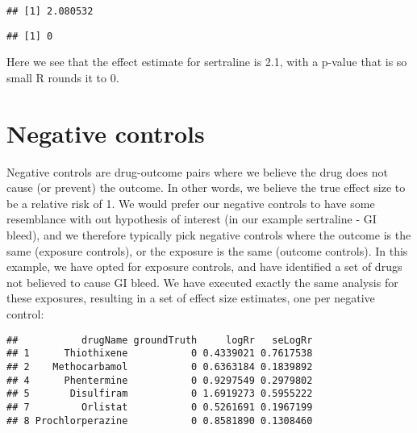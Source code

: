 \documentclass[]{article}
\newenvironment{Shaded}{\begin{snugshade}}{\end{snugshade}}
\newcommand{\DecValTok}[1]{\textcolor[rgb]{0.00,0.00,0.81}{#1}}
\newcommand{\KeywordTok}[1]{\textcolor[rgb]{0.13,0.29,0.53}{\textbf{#1}}}
\newcommand{\NormalTok}[1]{#1}
\newcommand{\OperatorTok}[1]{\textcolor[rgb]{0.81,0.36,0.00}{\textbf{#1}}}
\newcommand{\StringTok}[1]{\textcolor[rgb]{0.31,0.60,0.02}{#1}}
\begin{document}
\begin{verbatim}
## [1] 2.080532
\end{verbatim}

\begin{Shaded}
\end{Shaded}

\begin{verbatim}
## [1] 0
\end{verbatim}

Here we see that the effect estimate for sertraline is 2.1, with a
p-value that is so small R rounds it to 0.

\hypertarget{negative-controls}{%
\section{Negative controls}\label{negative-controls}}

Negative controls are drug-outcome pairs where we believe the drug does
not cause (or prevent) the outcome. In other words, we believe the true
effect size to be a relative risk of 1. We would prefer our negative
controls to have some resemblance with out hypothesis of interest (in
our example sertraline - GI bleed), and we therefore typically pick
negative controls where the outcome is the same (exposure controls), or
the exposure is the same (outcome controls). In this example, we have
opted for exposure controls, and have identified a set of drugs not
believed to cause GI bleed. We have executed exactly the same analysis
for these exposures, resulting in a set of effect size estimates, one
per negative control:

\begin{Shaded}
\end{Shaded}

\begin{verbatim}
##           drugName groundTruth     logRr   seLogRr
## 1      Thiothixene           0 0.4339021 0.7617538
## 2    Methocarbamol           0 0.6363184 0.1839892
## 4      Phentermine           0 0.9297549 0.2979802
## 5       Disulfiram           0 1.6919273 0.5955222
## 7         Orlistat           0 0.5261691 0.1967199
## 8 Prochlorperazine           0 0.8581890 0.1308460
\end{verbatim}
\end{document}
